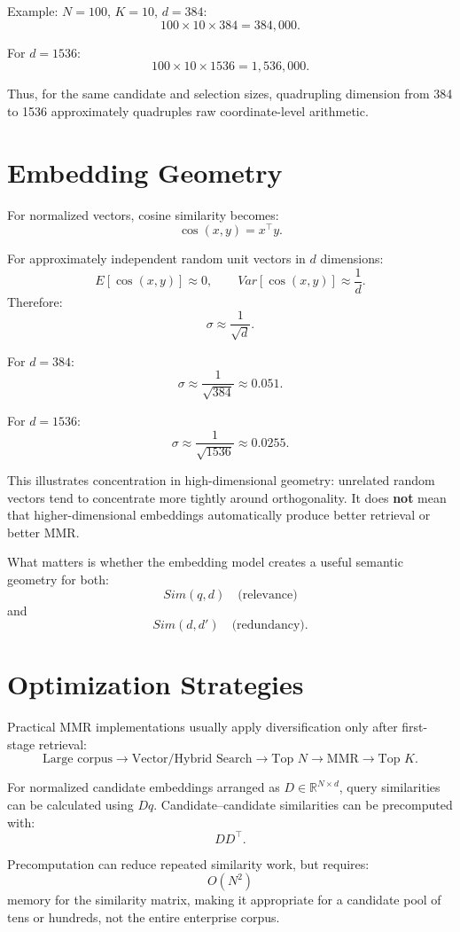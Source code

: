 \documentclass[12pt,a4paper]{article}
\begin{document}
Example: $N=100$, $K=10$, $d=384$:
\[
100\times10\times384=\boxed{384{,}000}.
\]

For $d=1536$:
\[
100\times10\times1536=\boxed{1{,}536{,}000}.
\]

Thus, for the same candidate and selection sizes, quadrupling dimension from 384 to 1536 approximately quadruples raw coordinate-level arithmetic.

\section{Embedding Geometry}
For normalized vectors, cosine similarity becomes:
\[
\cos(x,y)=x^\top y.
\]

For approximately independent random unit vectors in $d$ dimensions:
\[
E[\cos(x,y)]\approx0,\qquad Var[\cos(x,y)]\approx\frac{1}{d}.
\]
Therefore:
\[
\sigma\approx\frac{1}{\sqrt d}.
\]

For $d=384$:
\[
\sigma\approx\frac{1}{\sqrt{384}}\approx0.051.
\]

For $d=1536$:
\[
\sigma\approx\frac{1}{\sqrt{1536}}\approx0.0255.
\]

This illustrates concentration in high-dimensional geometry: unrelated random vectors tend to concentrate more tightly around orthogonality. It does \textbf{not} mean that higher-dimensional embeddings automatically produce better retrieval or better MMR.

What matters is whether the embedding model creates a useful semantic geometry for both:
\[
Sim(q,d)\quad\text{(relevance)}
\]
and
\[
Sim(d,d')\quad\text{(redundancy)}.
\]

\section{Optimization Strategies}
Practical MMR implementations usually apply diversification only after first-stage retrieval:
\[
\text{Large corpus}\rightarrow\text{Vector/Hybrid Search}\rightarrow\text{Top }N\rightarrow\text{MMR}\rightarrow\text{Top }K.
\]

For normalized candidate embeddings arranged as $D\in\mathbb{R}^{N\times d}$, query similarities can be calculated using $Dq$. Candidate--candidate similarities can be precomputed with:
\[
DD^\top.
\]

Precomputation can reduce repeated similarity work, but requires:
\[
O(N^2)
\]
memory for the similarity matrix, making it appropriate for a candidate pool of tens or hundreds, not the entire enterprise corpus.
\end{document}
